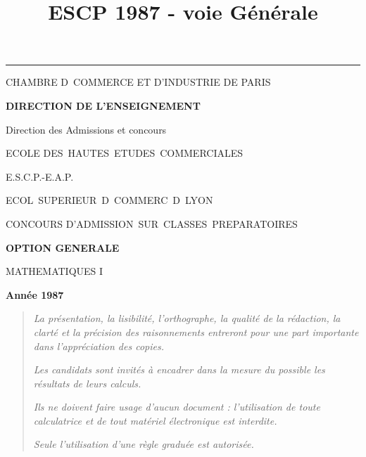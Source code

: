 \documentclass[11pt]{article}%
\title{\bf \vspace{-2cm} ESCP 1987 - voie Générale} %
\author{} %
\date{} %
\begin{document}
\maketitle %
\vspace{-1.4cm}\hrule %
\thispagestyle{fancy}

\vspace*{.2cm}




\begin{center}
{\small CHAMBRE D\E\ COMMERCE ET D'INDUSTRIE DE PARIS}

\textbf{DIRECTION DE L'ENSEIGNEMENT}

Direction des Admissions et concours

\underline{\hspace*{3cm}}

{\Large ECOLE DES\ HAUTES\ ETUDES\ COMMERCIALES}

{\Large E.S.C.P.-E.A.P.}

{\Large ECOL\E\ SUPERIEUR\E\ D\E\ COMMERC\E\ D\E\ LYON}{\large }

CONCOURS D'ADMISSION\ SUR\ CLASSES\ PREPARATOIRES

\underline{\hspace*{3cm}}

\textbf{OPTION GENERALE}

{\Large MATHEMATIQUES I}

\textbf{Année 1987}

\underline{\hspace*{3cm}}
\end{center}

\begin{quotation}
\noindent \textsl{La présentation, la lisibilité, l'orthographe, la
qualité
de la rédaction, la clarté et la précision des raisonnements entreront
pour
une part importante dans l'appréciation des copies.}

\noindent \textsl{Les candidats sont invités à encadrer dans la mesure
du
possible les résultats de leurs calculs.}

\noindent \textsl{Ils ne doivent faire usage d'aucun document :
l'utilisation de toute calculatrice et de tout matériel électronique
est
interdite.}

\noindent \textsl{Seule l'utilisation d'une règle graduée est
autorisée.}

\noindent \textsl{\hrulefill }
\end{quotation}
\end{document}
